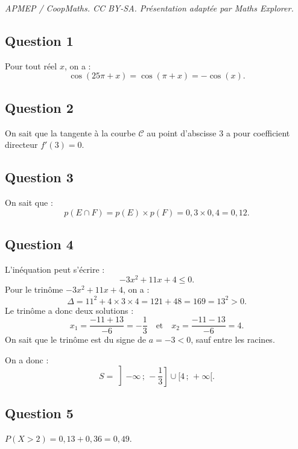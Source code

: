 \documentclass[10pt]{article}
\begin{document}
\noindent\textit{APMEP / CoopMaths. CC BY-SA. Présentation adaptée par Maths Explorer.}\par\medskip
\subsection*{Question 1}

Pour tout réel \(x\), on a :
\[
\cos(25\pi + x) = \cos(\pi + x) = - \cos(x).
\]

\subsection*{Question 2}

On sait que la tangente à la courbe \(\mathcal{C}\) au point d'abscisse 3 a pour coefficient directeur \(f'(3) = 0\).

\subsection*{Question 3}

On sait que :
\[
p(E \cap F) = p(E) \times p(F) = 0{,}3 \times 0{,}4 = 0{,}12.
\]

\subsection*{Question 4}

L'inéquation peut s'écrire :
\[
-3x^2 + 11x + 4 \leqslant 0.
\]
Pour le trinôme \(-3x^2 + 11x + 4\), on a :
\[
\Delta = 11^2 + 4 \times 3 \times 4 = 121 + 48 = 169 = 13^2 > 0.
\]
Le trinôme a donc deux solutions :
\[
x_1 = \dfrac{-11 + 13}{-6} = -\dfrac{1}{3} \quad \text{et} \quad x_2 = \dfrac{-11 - 13}{-6} = 4.
\]
On sait que le trinôme est du signe de \(a = -3 < 0\), sauf entre les racines.

On a donc :
\[
S = \left]-\infty \,;\, -\dfrac{1}{3} \right] \cup [4 \,;\, +\infty[.
\]

\subsection*{Question 5}

\( P(X > 2) = 0{,}13 + 0{,}36 = 0{,}49 \).
\end{document}
